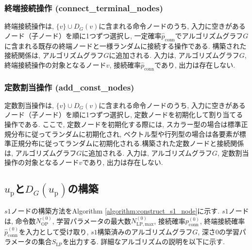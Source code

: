 \documentclass[11pt,oneside,openany,report]{jsbook}
\begin{document}
\subsubsection{終端接続操作 (connect\_terminal\_nodes)}
終端接続操作は, $\{v\} \cup D_G(v)$に含まれる命令ノードのうち, 入力に空きがあるノード（子ノード）を順に1つずつ選択し, 一定確率$\hat{p}_\mathrm{conn}$でアルゴリズムグラフ$G$に含まれる既存の終端ノードと一様ランダムに接続する操作である. 構築された接続関係は, アルゴリズムグラフ$G$に追加される. 入力は, アルゴリズムグラフ$G$, 終端接続操作の対象となるノード$v$, 接続確率$\hat{p}_\mathrm{conn}$であり, 出力は存在しない.

\subsubsection{定数割当操作 (add\_const\_nodes)}
定数割当操作は, $\{v\} \cup D_G(v)$に含まれる命令ノードのうち, 入力に空きがあるノード（子ノード）を順に1つずつ選択し, 定数ノードを初期化して割り当てる操作である. ここで, 定数ノードを初期化する際には, スカラー型の場合は標準正規分布に従ってランダムに初期化され, ベクトル型や行列型の場合は各要素が標準正規分布に従ってランダムに初期化される.構築された定数ノードと接続関係は, アルゴリズムグラフ$G$に追加される. 入力は, アルゴリズムグラフ$G$, 定数割当操作の対象となるノード$v$であり, 出力は存在しない.

\subsection{$u_\mathrm{p}$と$D_G(u_\mathrm{p})$の構築} \label{subsec:proposed:initialization:s1}

$s1$ノードの構築方法をAlgorithm \ref{algorithm:construct_s1_node}に示す. $s1$ノードは, 命令数$N_{\mathrm{OP}}^{(0)}$, 学習パラメータの最大数$N_{\mathrm{LP}, \mathrm{max}}^{(0)}$, 接続確率$p^{(0)}_\mathrm{conn}$, 終端接続確率$\hat{p}^{(0)}_\mathrm{conn}$を入力として受け取り, $s1$構築済みのアルゴリズムグラフ$G$, 深さ0の学習パラメータの集合$S_\mathrm{LP}$を出力する. 詳細なアルゴリズムの説明を以下に示す.
\end{document}
